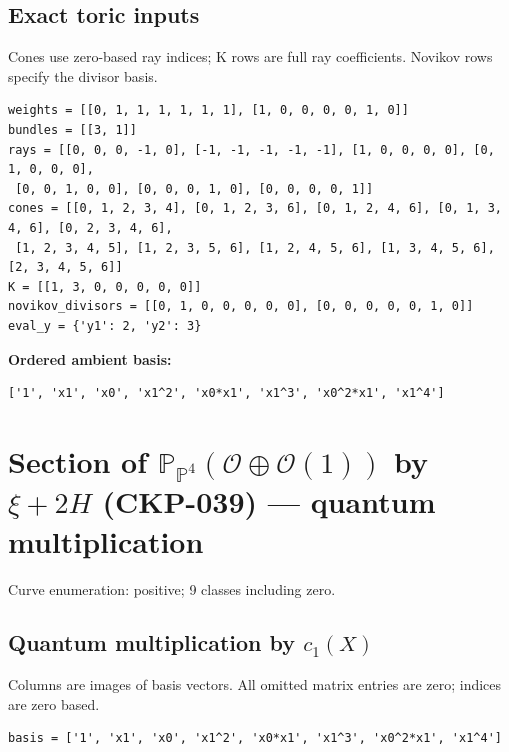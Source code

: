 \documentclass[10pt,a4paper]{article}
\begin{document}
\subsection*{Exact toric inputs}
Cones use zero-based ray indices; K rows are full ray coefficients. Novikov rows specify the divisor basis.

\begin{lstlisting}
weights = [[0, 1, 1, 1, 1, 1, 1], [1, 0, 0, 0, 0, 1, 0]]
bundles = [[3, 1]]
rays = [[0, 0, 0, -1, 0], [-1, -1, -1, -1, -1], [1, 0, 0, 0, 0], [0, 1, 0, 0, 0],
 [0, 0, 1, 0, 0], [0, 0, 0, 1, 0], [0, 0, 0, 0, 1]]
cones = [[0, 1, 2, 3, 4], [0, 1, 2, 3, 6], [0, 1, 2, 4, 6], [0, 1, 3, 4, 6], [0, 2, 3, 4, 6],
 [1, 2, 3, 4, 5], [1, 2, 3, 5, 6], [1, 2, 4, 5, 6], [1, 3, 4, 5, 6], [2, 3, 4, 5, 6]]
K = [[1, 3, 0, 0, 0, 0, 0]]
novikov_divisors = [[0, 1, 0, 0, 0, 0, 0], [0, 0, 0, 0, 0, 1, 0]]
eval_y = {'y1': 2, 'y2': 3}
\end{lstlisting}

\textbf{Ordered ambient basis:}
\begin{lstlisting}
['1', 'x1', 'x0', 'x1^2', 'x0*x1', 'x1^3', 'x0^2*x1', 'x1^4']
\end{lstlisting}

\clearpage\section*{Section of $\mathbb P_{\mathbb P^{4}}(\mathcal O\oplus \mathcal O(1))$ by $\xi +2H$ (CKP-039) --- quantum multiplication}

Curve enumeration: positive; 9 classes including zero.
\subsection*{Quantum multiplication by $c_1(X)$}
Columns are images of basis vectors. All omitted matrix entries are zero; indices are zero based.

\begin{lstlisting}
basis = ['1', 'x1', 'x0', 'x1^2', 'x0*x1', 'x1^3', 'x0^2*x1', 'x1^4']
\end{lstlisting}
\end{document}
